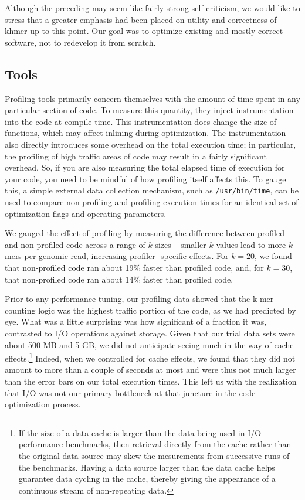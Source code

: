 \documentclass{article}
\begin{document}
Although the preceding may seem like fairly strong self-criticism, we
would like to stress that a greater emphasis had been placed on
utility and correctness of khmer up to this point.  Our goal was to optimize
existing and mostly correct software, not to redevelop it from scratch.

\subsection{Tools}

Profiling tools primarily concern themselves with the amount of time spent in
any particular section of code. To measure this quantity, they inject
instrumentation into the code at compile time. This instrumentation does change
the size of functions, which may affect inlining during optimization.  The
instrumentation also directly introduces some overhead on the total execution
time; in particular, the profiling of high traffic areas of code may result in
a fairly significant overhead. So, if you are also measuring the total elapsed
time of execution for your code, you need to be mindful of how profiling itself
affects this. To gauge this, a simple external data collection mechanism, such
as \texttt{/usr/bin/time}, can be used to compare non-profiling and profiling
execution times for an identical set of optimization flags and operating
parameters.  

We gauged the effect of profiling by measuring the difference between
profiled and non-profiled code across a range of $k$ sizes -- smaller
$k$ values lead to more $k$-mers per genomic read, increasing
profiler- specific effects.  For $k = 20$, we found that non-profiled
code ran about 19\% faster than profiled code, and, for $k = 30$, that
non-profiled code ran about 14\% faster than profiled code.


Prior to any performance tuning, our profiling data showed that the k-mer
counting logic was the highest traffic portion of the code, as we had predicted
by eye. What was a little surprising was how significant of a fraction it was,
contrasted to I/O operations against storage. Given that our trial data sets
were about 500 MB and 5 GB, we did not anticipate seeing much in the way of
cache effects.\footnote{If the size of a data cache is larger than the data
being used in I/O performance benchmarks, then retrieval directly from the
cache rather than the original data source may skew the mesurements from
successive runs of the benchmarks. Having a data source larger than the data
cache helps guarantee data cycling in the cache, thereby giving the appearance
of a continuous stream of non-repeating data.} Indeed, when we controlled for
cache effects, we found that they did not amount to more than a couple of
seconds at most and were thus not much larger than the error bars on our total
execution times.  This left us with the realization that I/O was not our
primary bottleneck at that juncture in the code optimization process.
\end{document}
